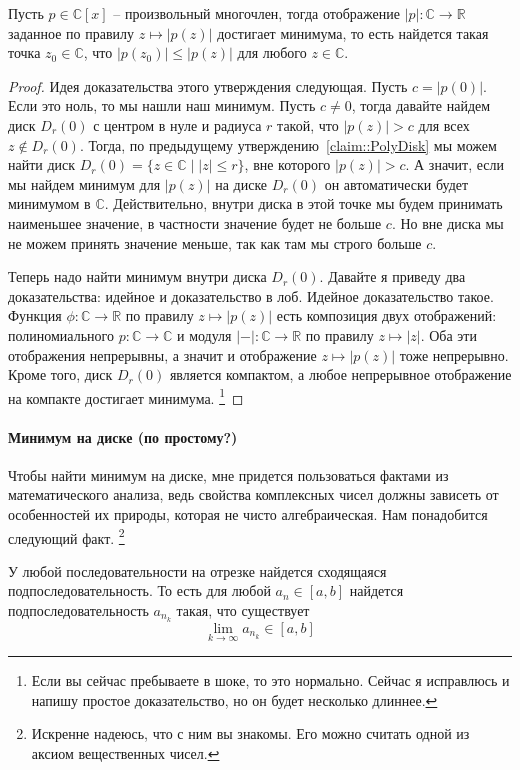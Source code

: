 \begin{claim}
Пусть $p\in \mathbb C[x]$ -- произвольный многочлен, тогда отображение $|p|\colon \mathbb C\to \mathbb R$ заданное по правилу $z\mapsto |p(z)|$ достигает минимума, то есть найдется такая точка $z_0\in\mathbb C$, что $|p(z_0)|\leqslant |p(z)|$ для любого $z\in \mathbb C$.
\end{claim}
\begin{proof}
Идея доказательства этого утверждения следующая.
Пусть $c = |p(0)|$.
Если это ноль, то мы нашли наш минимум.
Пусть $c\neq 0$, тогда давайте найдем диск $D_r(0)$ с центром в нуле и радиуса $r$ такой, что $|p(z)| > c$ для всех $z\notin D_r(0)$.
Тогда, по предыдущему утверждению~\ref{claim::PolyDisk} мы можем найти диск $D_r(0)= \{z\in\mathbb C\mid |z|\leqslant r\}$, вне которого $|p(z)|>c$.
А значит, если мы найдем минимум для $|p(z)|$ на диске $D_r(0)$ он автоматически будет минимумом в $\mathbb C$.
Действительно, внутри диска в этой точке мы будем принимать наименьшее значение, в частности значение будет не больше $c$.
Но вне диска мы не можем принять значение меньше, так как там мы строго больше $c$.

Теперь надо найти минимум внутри диска $D_r(0)$.
Давайте я приведу два доказательства: идейное и доказательство в лоб.
Идейное доказательство такое.
Функция $\phi\colon \mathbb C\to \mathbb R$ по правилу $z\mapsto |p(z)|$ есть композиция двух отображений: полиномиального $p\colon \mathbb C\to \mathbb C$ и модуля $|{-}|\colon \mathbb C\to\mathbb R$ по правилу $z\mapsto |z|$.
Оба эти отображения непрерывны, а значит и отображение $z\mapsto |p(z)|$ тоже непрерывно.
Кроме того, диск $D_r(0)$ является компактом, а любое непрерывное отображение на компакте достигает минимума.%
\footnote{Если вы сейчас пребываете в шоке, то это нормально.
Сейчас я исправлюсь и напишу простое доказательство, но он будет несколько длиннее.}
\end{proof}

\paragraph{Минимум на диске (по простому?)}

Чтобы найти минимум на диске, мне придется пользоваться фактами из математического анализа, ведь свойства комплексных чисел должны зависеть от особенностей их природы, которая не чисто алгебраическая.
Нам понадобится следующий факт.%
\footnote{Искренне надеюсь, что с ним вы знакомы.
Его можно считать одной из аксиом вещественных чисел.}
\begin{claim*}
[БД]
У любой последовательности на отрезке найдется сходящаяся подпоследовательность.
То есть для любой $a_n\in [a, b]$ найдется подпоследовательность $a_{n_k}$ такая, что существует
\[
\lim_{k\to \infty}a_{n_k}\in [a, b]
\]
\end{claim*}

